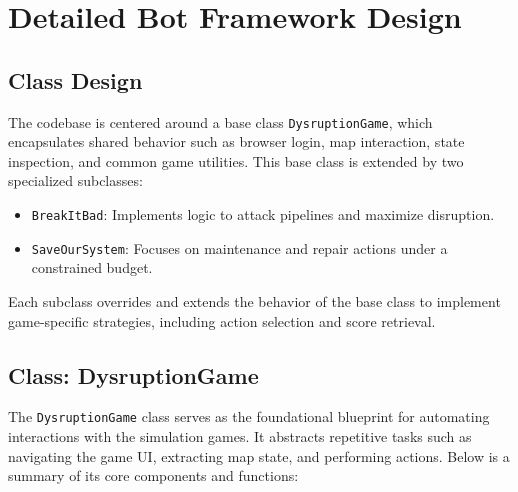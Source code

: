 \documentclass[12pt,a4paper]{article}
\begin{document}
    \section{Detailed Bot Framework Design}
    \label{sec:appendix-bot-framework}

    \subsection*{Class Design}
    \label{subsec:class-design}

    The codebase is centered around a base class \texttt{DysruptionGame}, which encapsulates shared behavior such as browser login, map interaction, state inspection, and common game utilities. This base class is extended by two specialized subclasses:
    \begin{itemize}
        \item \texttt{BreakItBad}: Implements logic to attack pipelines and maximize disruption.
        \item \texttt{SaveOurSystem}: Focuses on maintenance and repair actions under a constrained budget.
    \end{itemize}

    Each subclass overrides and extends the behavior of the base class to implement game-specific strategies, including action selection and score retrieval.

    \subsection*{Class: DysruptionGame}
    \label{subsec:class-dysruptiongame}

    The \texttt{DysruptionGame} class serves as the foundational blueprint for automating interactions with the simulation games. It abstracts repetitive tasks such as navigating the game UI, extracting map state, and performing actions. Below is a summary of its core components and functions:
\end{document}
